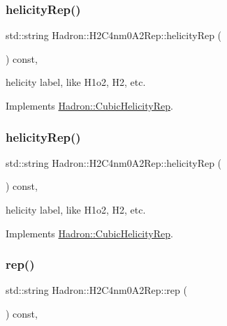 \subsubsection{\texorpdfstring{helicityRep()}{helicityRep()}\hspace{0.1cm}{\footnotesize\ttfamily [2/3]}}
{\footnotesize\ttfamily std\+::string Hadron\+::\+H2\+C4nm0\+A2\+Rep\+::helicity\+Rep (\begin{DoxyParamCaption}{ }\end{DoxyParamCaption}) const\hspace{0.3cm}{\ttfamily [inline]}, {\ttfamily [virtual]}}

helicity label, like H1o2, H2, etc. 

Implements \mbox{\hyperlink{structHadron_1_1CubicHelicityRep_af1096946b7470edf0a55451cc662f231}{Hadron\+::\+Cubic\+Helicity\+Rep}}.

\mbox{\label{structHadron_1_1H2C4nm0A2Rep_a8265918d931b1fc4c74311511fb81037}} 
\subsubsection{\texorpdfstring{helicityRep()}{helicityRep()}\hspace{0.1cm}{\footnotesize\ttfamily [3/3]}}
{\footnotesize\ttfamily std\+::string Hadron\+::\+H2\+C4nm0\+A2\+Rep\+::helicity\+Rep (\begin{DoxyParamCaption}{ }\end{DoxyParamCaption}) const\hspace{0.3cm}{\ttfamily [inline]}, {\ttfamily [virtual]}}

helicity label, like H1o2, H2, etc. 

Implements \mbox{\hyperlink{structHadron_1_1CubicHelicityRep_af1096946b7470edf0a55451cc662f231}{Hadron\+::\+Cubic\+Helicity\+Rep}}.

\mbox{\label{structHadron_1_1H2C4nm0A2Rep_acf769194280e756693be59efab932c8d}} 
\subsubsection{\texorpdfstring{rep()}{rep()}\hspace{0.1cm}{\footnotesize\ttfamily [1/5]}}
{\footnotesize\ttfamily std\+::string Hadron\+::\+H2\+C4nm0\+A2\+Rep\+::rep (\begin{DoxyParamCaption}{ }\end{DoxyParamCaption}) const\hspace{0.3cm}{\ttfamily [inline]}, {\ttfamily [virtual]}}




